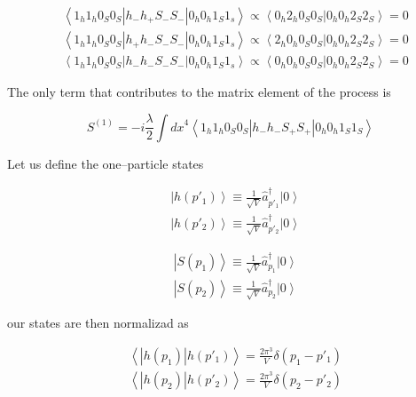 \begin{equation}
\begin{split}
    &\left \langle 1_h 1_h 0_S 0_S | h_- h_+ S_- S_-|0_h 0_h 1_S 1_s\right\rangle \propto \left \langle 0_h 2_h 0_S 0_S|0_h 0_h 2_S 2_S\right \rangle=0\\
    &\left \langle 1_h 1_h 0_S 0_S | h_+ h_- S_- S_-|0_h 0_h 1_S 1_s\right\rangle \propto \left \langle 2_h 0_h 0_S 0_S|0_h 0_h 2_S 2_S\right \rangle=0\\
    &\left \langle 1_h 1_h 0_S 0_S | h_- h_- S_- S_-|0_h 0_h 1_S 1_s\right\rangle \propto \left \langle 0_h 0_h 0_S 0_S|0_h 0_h 2_S 2_S\right \rangle=0
  \end{split}
\end{equation}

The only term that contributes to the matrix element of the process is

\begin{equation}
  S^{(1)}=-i\frac{\lambda}{2} \int{{dx}^4 \left\langle 1_h 1_h 0_S 0_S|h_- h_- S_+ S_+|0_h 0_h 1_S 1_S \right \rangle}
\end{equation}
 
Let us define the one–particle states

\begin{equation}
  \begin{split}
    &\left| h(p'_1)\right \rangle \equiv \frac{1}{\sqrt{V}} \hat{a}_{p'_1}^{\dagger} \left| 0 \right \rangle\\ 
    &\left| h(p'_2)\right \rangle \equiv \frac{1}{\sqrt{V}} \hat{a}_{p'_2}^{\dagger} \left | 0 \right \rangle
  \end{split}
\end{equation}

\begin{equation}
  \begin{split}
    &\left| S(p_1)\right \rangle \equiv \frac{1}{\sqrt{V}} \hat{a}_{p_1}^{\dagger} \left| 0 \right \rangle\\ 
    &\left| S(p_2)\right \rangle \equiv \frac{1}{\sqrt{V}} \hat{a}_{p_2}^{\dagger} \left | 0 \right \rangle
  \end{split}
\end{equation}

our states are then normalizad as

\begin{equation}
  \begin{split}
    &\left\langle| h(p_1) | h(p'_1)\right \rangle = \frac{2\pi^3}{V} \delta (p_1-p'_1)\\
    &\left\langle | h(p_2) | h(p'_2)\right \rangle = \frac{2\pi^3}{V} \delta(p_2-p'_2)
  \end{split}
\end{equation}


